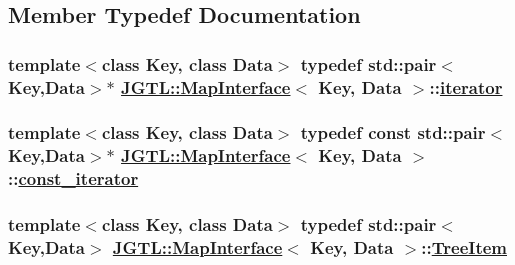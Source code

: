 \subsection{Member Typedef Documentation}
\hypertarget{class_j_g_t_l_1_1_map_interface_a8fcdbd899d0df84ce1aaa67d8dc000e}{
\subsubsection[iterator]{\setlength{\rightskip}{0pt plus 5cm}template$<$class Key, class Data$>$ typedef std::pair$<$Key,Data$>$$\ast$ \hyperlink{class_j_g_t_l_1_1_map_interface}{JGTL::Map\-Interface}$<$ Key, Data $>$::\hyperlink{class_j_g_t_l_1_1_map_interface_a8fcdbd899d0df84ce1aaa67d8dc000e}{iterator}}}
\label{class_j_g_t_l_1_1_map_interface_a8fcdbd899d0df84ce1aaa67d8dc000e}


\hypertarget{class_j_g_t_l_1_1_map_interface_bbce6cc516069a5a504e0ae5b9aecd88}{
\subsubsection[const\_\-iterator]{\setlength{\rightskip}{0pt plus 5cm}template$<$class Key, class Data$>$ typedef const std::pair$<$Key,Data$>$$\ast$ \hyperlink{class_j_g_t_l_1_1_map_interface}{JGTL::Map\-Interface}$<$ Key, Data $>$::\hyperlink{class_j_g_t_l_1_1_map_interface_bbce6cc516069a5a504e0ae5b9aecd88}{const\_\-iterator}}}
\label{class_j_g_t_l_1_1_map_interface_bbce6cc516069a5a504e0ae5b9aecd88}


\hypertarget{class_j_g_t_l_1_1_map_interface_b7e9654bf9b2a906465e362475466ca5}{
\subsubsection[TreeItem]{\setlength{\rightskip}{0pt plus 5cm}template$<$class Key, class Data$>$ typedef std::pair$<$Key,Data$>$ \hyperlink{class_j_g_t_l_1_1_map_interface}{JGTL::Map\-Interface}$<$ Key, Data $>$::\hyperlink{class_j_g_t_l_1_1_map_interface_b7e9654bf9b2a906465e362475466ca5}{Tree\-Item}}}
\label{class_j_g_t_l_1_1_map_interface_b7e9654bf9b2a906465e362475466ca5}


